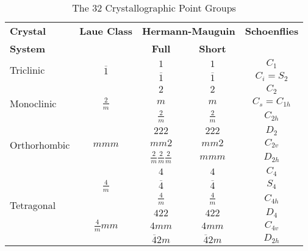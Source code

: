 \documentclass[12pt]{article}
\begin{document}
\renewcommand{\arraystretch}{1.1}
\begin{table}[h]
\centering
\caption{The 32 Crystallographic Point Groups}
\small
  \begin{tabular}{lcccc}
    \hline
	\textbf{Crystal}           & \textbf{Laue Class}             & \multicolumn{2}{l}{\textbf{Hermann-Mauguin}} & \textbf{Schoenflies}\\
   	\textbf{System}            &                                 & \textbf{Full} & \textbf{Short }              & \\
   	\hline
   	\hline
   	\multirow{2}{*}{Triclinic} & \multirow{2}{*}{$\overline{1}$} & $1$ & $1$ & $C_1$\\
                               &                                 & $\overline{1}$ & $\overline{1}$ & $C_i = S_2$ \\
    \hline
    \multirow{3}{*}{Monoclinic} & \multirow{3}{*}{$\displaystyle \frac{2}{m}$} & $2$ & $2$ & $C_2$\\
                               &                                 & $m$ & $m$ & $C_s = C_{1h}$ \\
                               &                                 & $\displaystyle \frac{2}{m}$ & $\displaystyle \frac{2}{m}$ & $C_{2h}$ \\[1.5ex]
    \hline 
    \multirow{3}{*}{Orthorhombic} & \multirow{3}{*}{$mmm$} & $222$ & $222$ & $D_2$\\
                               &                           & $mm2$ & $mm2$ & $C_{2v}$ \\
                               &                           & $\displaystyle \frac{2}{m}\frac{2}{m}\frac{2}{m}$ & $mmm$ & $D_{2h}$ \\[1.5ex]
    \hline
    \multirow{7}{*}{Tetragonal} & \multirow{3}{*}{$\displaystyle \frac{4}{m}$} & $4$ & $4$ & $C_4$\\
                               &                                 & $\overline{4}$ & $\overline{4}$ & $S_4$ \\
                               &                                 & $\displaystyle \frac{4}{m}$ & $\displaystyle \frac{4}{m}$ & $C_{4h}$ \\[1.5ex]
                               \cline{2-5}
							  & \multirow{4}{*}{$\displaystyle \frac{4}{m}mm$} & $422$ & $422$ & $D_4$\\
                               &                                 & $4mm$ & $4mm$ & $C_{4v}$ \\
                               &                                 & $\overline{4}2m$ & $\overline{4}2m$ & $D_{2h}$ \\ 

\end{tabular}
\end{table}
\end{document}
